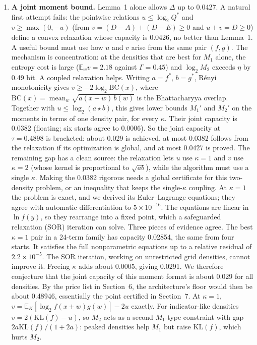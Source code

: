 \documentclass[11pt]{article}
\DeclareMathOperator{\mean}{mean}
\newcommand{\E}{\mathbb{E}}
\newcommand{\KL}{\mathrm{KL}}
\theoremstyle{plain}
\begin{document}
\begin{enumerate}
\item \textbf{A joint moment bound.} Lemma~1 alone allows $\Delta$ up to 0.0427. A natural first attempt fails: the pointwise relations $u \le \log_2 Q^*$ and $v \ge \max(0, -u)$ (from $v = (D-A) + (D-E) \ge 0$ and $u + v = D \ge 0$) define a convex relaxation whose capacity is 0.0426, no better than Lemma~1. A useful bound must use how $u$ and $v$ arise from the same pair $(f, g)$. The mechanism is concentration: at the densities that are best for $M_1$ alone, the entropy cost is large ($\E_w v = 2.18$ against $\Gamma = 0.45$) and $\log_2 M_2$ exceeds $\eta$ by 0.49 bit. A coupled relaxation helps. Writing $a = f^*$, $b = g^*$, R\'enyi monotonicity gives $v \ge -2 \log_2 \mathrm{BC}(x)$, where $\mathrm{BC}(x) = \mean_w \sqrt{a(x+w)\, b(w)}$ is the Bhattacharyya overlap. Together with $u \le \log_2 (a \star b)$, this gives lower bounds $M_1'$ and $M_2'$ on the moments in terms of one density pair, for every $\kappa$. Their joint capacity is 0.0382 (floating; six starts agree to 0.0006). So the joint capacity at $\tau = 0.4898$ is bracketed: about 0.029 is achieved, at most 0.0382 follows from the relaxation if its optimization is global, and at most 0.0427 is proved. The remaining gap has a clean source: the relaxation lets $u$ use $\kappa = 1$ and $v$ use $\kappa = 2$ (whose kernel is proportional to $\sqrt{ab}$), while the algorithm must use a single $\kappa$. Making the 0.0382 rigorous needs a global certificate for this two-density problem, or an inequality that keeps the single-$\kappa$ coupling. At $\kappa = 1$ the problem is exact, and we derived its Euler--Lagrange equations; they agree with automatic differentiation to $5\times10^{-16}$. The equations are linear in $\ln f(y)$, so they rearrange into a fixed point, which a safeguarded relaxation (SOR) iteration can solve. Three pieces of evidence agree. The best $\kappa = 1$ pair in a 24-term family has capacity 0.02854, the same from four starts. It satisfies the full nonparametric equations up to a relative residual of $2.2\times10^{-5}$. The SOR iteration, working on unrestricted grid densities, cannot improve it. Freeing $\kappa$ adds about 0.0005, giving 0.0291. We therefore conjecture that the joint capacity of this moment format is about 0.029 for all densities. By the price list in Section~6, the architecture's floor would then be about 0.48946, essentially the point certified in Section~7. At $\kappa = 1$, $v = \E_K[\log_2 f(x+w)g(w)] - 2u$ exactly. For indicator-like densities $v = 2(\KL(f) - u)$, so $M_2$ acts as a second $M_1$-type constraint with gap $2a \KL(f)/(1+2a)$: peaked densities help $M_1$ but raise $\KL(f)$, which hurts $M_2$.

\end{enumerate}
\end{document}
